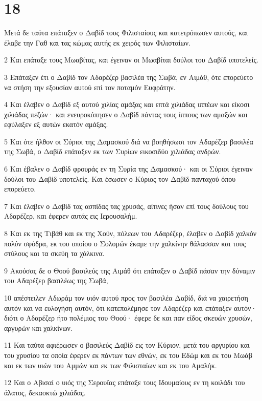 \chapter{18}

\par Μετά δε ταύτα επάταξεν ο Δαβίδ τους Φιλισταίους και κατετρόπωσεν αυτούς, και έλαβε την Γαθ και τας κώμας αυτής εκ χειρός των Φιλισταίων.
\par 2 Και επάταξε τους Μωαβίτας, και έγειναν οι Μωαβίται δούλοι του Δαβίδ υποτελείς.
\par 3 Επάταξεν έτι ο Δαβίδ τον Αδαρέζερ βασιλέα της Σωβά, εν Αιμάθ, ότε επορεύετο να στήση την εξουσίαν αυτού επί τον ποταμόν Ευφράτην.
\par 4 Και έλαβεν ο Δαβίδ εξ αυτού χιλίας αμάξας και επτά χιλιάδας ιππέων και είκοσι χιλιάδας πεζών· και ενευροκόπησεν ο Δαβίδ πάντας τους ίππους των αμαξών και εφύλαξεν εξ αυτών εκατόν αμάξας.
\par 5 Και ότε ήλθον οι Σύριοι της Δαμασκού διά να βοηθήσωσι τον Αδαρέζερ βασιλέα της Σωβά, ο Δαβίδ επάταξεν εκ των Συρίων εικοσιδύο χιλιάδας ανδρών.
\par 6 Και έβαλεν ο Δαβίδ φρουράς εν τη Συρία της Δαμασκού· και οι Σύριοι έγειναν δούλοι του Δαβίδ υποτελείς. Και έσωσεν ο Κύριος τον Δαβίδ πανταχού όπου επορεύετο.
\par 7 Και έλαβεν ο Δαβίδ τας ασπίδας τας χρυσάς, αίτινες ήσαν επί τους δούλους του Αδαρέζερ, και έφερεν αυτάς εις Ιερουσαλήμ.
\par 8 Και εκ της Τιβάθ και εκ της Χούν, πόλεων του Αδαρέζερ, έλαβεν ο Δαβίδ χαλκόν πολύν σφόδρα, εκ του οποίου ο Σολομών έκαμε την χαλκίνην θάλασσαν και τους στύλους και τα σκεύη τα χάλκινα.
\par 9 Ακούσας δε ο Θοού βασιλεύς της Αιμάθ ότι επάταξεν ο Δαβίδ πάσαν την δύναμιν του Αδαρέζερ βασιλέως της Σωβά,
\par 10 απέστειλεν Αδωράμ τον υιόν αυτού προς τον βασιλέα Δαβίδ, διά να χαιρετήση αυτόν και να ευλογήση αυτόν, ότι κατεπολέμησε τον Αδαρέζερ και επάταξεν αυτόν· διότι ο Αδαρέζερ ήτο πολέμιος του Θοού· έφερε δε και παν είδος σκευών χρυσών, αργυρών και χαλκίνων.
\par 11 Και ταύτα αφιέρωσεν ο βασιλεύς Δαβίδ εις τον Κύριον, μετά του αργυρίου και του χρυσίου τα οποία έφερεν εκ πάντων των εθνών, εκ του Εδώμ και εκ του Μωάβ και εκ των υιών του Αμμών και εκ των Φιλισταίων και εκ του Αμαλήκ.
\par 12 Και ο Αβισαί ο υιός της Σερουΐας επάταξε τους Ιδουμαίους εν τη κοιλάδι του άλατος, δεκαοκτώ χιλιάδας.
